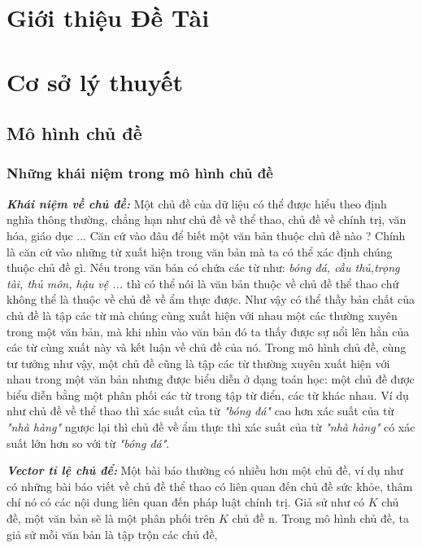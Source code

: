 \documentclass[fontsize=13pt]{scrartcl}
\begin{document}
\newpage
\listoffigures

\newpage
\listoftables
\newpage
\section{Giới thiệu Đề Tài}

\section{Cơ sở lý thuyết}
\subsection{Mô hình chủ đề}
\subsubsection{Những khái niệm trong mô hình chủ đề}
\textit{\textbf{Khái niệm về chủ đề:}} Một chủ đề của dữ liệu có thể được hiểu theo định nghĩa thông thường, chẳng hạn như chủ đề về thể thao, chủ đề về chính trị, văn hóa, giáo dục ... Căn cứ vào đâu để biết một văn bản thuộc chủ đề nào ? Chính là căn cứ vào những từ xuất hiện trong văn bản mà ta có thể xác định chúng thuộc chủ đề gì. Nếu trong văn bản có chứa các từ như: \textit{bóng đá, cầu thủ,trọng tài, thủ môn, hậu vệ ...} thì có thể nói là văn bản thuộc về chủ đề thể thao chứ không thể là thuộc về chủ đề về ẩm thực được. Như vậy có thể thầy bản chất của chủ đề là tập các từ mà chúng cùng xuất hiện với nhau một các thường xuyên trong một văn bản, mà khi nhìn vào văn bản đó ta thấy được sự nổi lên hẳn của các từ cùng xuất này và kết luận về chủ đề của nó. Trong mô hình chủ đề, cùng tư tưởng như vậy, một chủ đề cũng là tập các từ thường xuyên xuất hiện với nhau trong một văn bản nhưng được biểu diễn ở dạng toán học: một chủ đề được biểu diễn bằng một phân phối các từ trong tập từ điển, các từ khác nhau. Ví dụ như chủ đề về thể thao thì xác suất của từ \textit{"bóng đá"} cao hơn xác suất của từ \textit{"nhà hàng"} ngược lại thì chủ đề về ẩm thực thì xác suất của từ \textit{"nhà hàng"} có xác suất lớn hơn so với từ \textit{"bóng đá"}.
\par
\textbf{\textit{Vector tỉ lệ chủ để:}} Một bài báo thường có nhiều hơn một chủ đề, ví dụ như có những bài báo viết về chủ đề thể thao có liên quan đến chủ đề sức khỏe, thâm chí nó có các nội dung liên quan đến pháp luật chính trị. Giả sử như có $K$ chủ đề, một văn bản sẽ là một phân phối trên $K$ chủ đề n. Trong mô hình chủ đề, ta giả sử mỗi văn bản là tập trộn các chủ đề,
\end{document}
